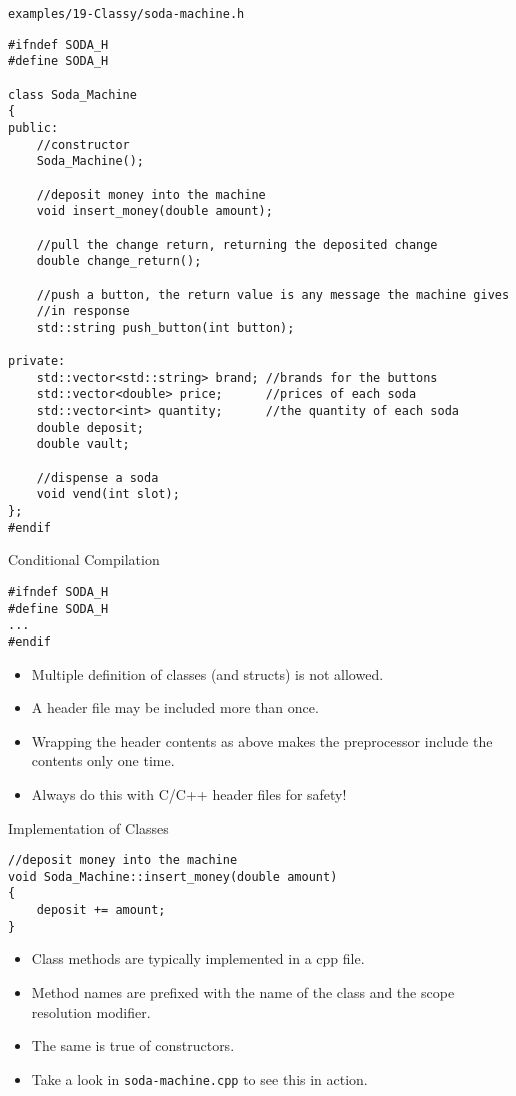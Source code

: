 \documentclass[]{beamer}
\begin{document}
\begin{frame}[fragile]{\texttt{examples/19-Classy/soda-machine.h}}
\begin{adjustbox}{max totalheight=0.8\textheight}
\begin{BVerbatim}
#ifndef SODA_H
#define SODA_H

class Soda_Machine
{
public:
    //constructor
    Soda_Machine();

    //deposit money into the machine
    void insert_money(double amount);

    //pull the change return, returning the deposited change
    double change_return();

    //push a button, the return value is any message the machine gives
    //in response
    std::string push_button(int button);

private:
    std::vector<std::string> brand; //brands for the buttons
    std::vector<double> price;      //prices of each soda
    std::vector<int> quantity;      //the quantity of each soda
    double deposit;
    double vault;

    //dispense a soda
    void vend(int slot);
};
#endif
\end{BVerbatim}
\end{adjustbox}
\end{frame}

\begin{frame}[fragile]{Conditional Compilation}
\begin{BVerbatim}
#ifndef SODA_H
#define SODA_H
...
#endif
\end{BVerbatim}

\begin{itemize}[<+->]
    \item Multiple definition of classes (and structs) is not allowed.
    \item A header file may be included more than once.
    \item Wrapping the header contents as above makes the preprocessor
        include the contents only one time.
    \item Always do this with C/C++ header files for safety!
\end{itemize}
\end{frame}

\begin{frame}[fragile]{Implementation of Classes}
\begin{BVerbatim}
//deposit money into the machine
void Soda_Machine::insert_money(double amount)
{
    deposit += amount;
}
\end{BVerbatim}

\begin{itemize}[<+->]
    \item Class methods are typically implemented in a cpp file.
    \item Method names are prefixed with the name of the class and the
        scope resolution modifier.
    \item The same is true of constructors.
    \item Take a look in \texttt{soda-machine.cpp} to see this in
        action.
\end{itemize}
\end{frame}
\end{document}

